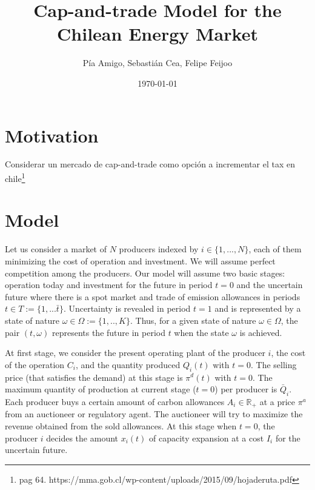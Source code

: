 \documentclass[11pt, letterpaper]{article}
\title{Cap-and-trade Model for the Chilean Energy Market}
\author{P\'ia Amigo, Sebasti\'an Cea, Felipe Feijoo}
\date{\today}
\begin{document}
\linenumbers
\maketitle

\section{Motivation}

Considerar un mercado de cap-and-trade como opción a incrementar el tax en chile\footnote{pag 64. https://mma.gob.cl/wp-content/uploads/2015/09/hojaderuta.pdf}



\section{Model}\label{model}

Let us consider a market of $N$ producers indexed by $i\in\{1,...,N\}$, each of them minimizing the cost of operation and investment. We will assume perfect competition among the producers. Our model will assume two basic stages: operation today and investment for the future in period $t=0$ and the uncertain future where there is a spot market and trade of emission allowances in periods $t\in T:=\{1,...\bar{t}\}$. Uncertainty is revealed in period $t=1$ and is represented by a state of nature $\omega\in\Omega:=\{1,..,K\}$. Thus, for a given state of nature $\omega\in\Omega$, the pair $(t,\omega)$ represents the future in period $t$ when the state $\omega$ is achieved.

\smallskip

At first stage, we consider the present operating plant of the producer $i$, the cost of the operation $C_i$, and the quantity produced $Q_i(t)$ with $t=0$. The selling price (that satisfies the demand) at this stage is $\pi^d(t)$ with $t=0$. The maximum quantity of production at current stage ($t=0$) per producer is $\bar{Q}_i$. Each producer buys a certain amount of carbon allowances $A_i\in\mathbb{R}_+$ at a price $\pi^{a}$ from an auctioneer or regulatory agent.  The auctioneer will try to maximize the revenue obtained from the sold allowances. At this stage when $t=0$, the producer $i$ decides the amount $x_i(t)$ of capacity expansion at a cost $I_i$ for the uncertain future.

\smallskip
\end{document}
